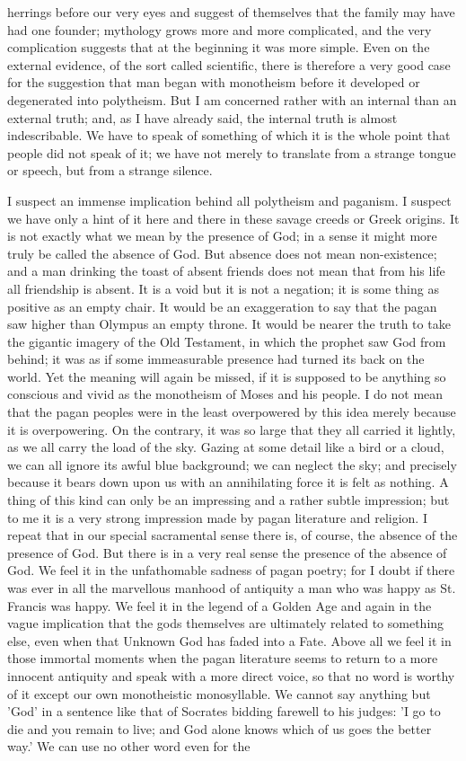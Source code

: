 herrings before our very eyes and suggest of themselves that the family may have had one founder; mythology grows more and more complicated, and the very complication suggests that at the beginning it was more simple. Even on the external evidence, of the sort called scientific, there is therefore a very good case for the suggestion that man began with monotheism before it developed or degenerated into polytheism. But I am concerned rather with an internal than an external truth; and, as I have already said, the internal truth is almost indescribable. We have to speak of something of which it is the whole point that people did not speak of it; we have not merely to translate from a strange tongue or speech, but from a strange silence.

I suspect an immense implication behind all polytheism and paganism. I suspect we have only a hint of it here and there in these savage creeds or Greek origins. It is not exactly what we mean by the presence of God; in a sense it might more truly be called the absence of God. But absence does not mean non-existence; and a man drinking the toast of absent friends does not mean that from his life all friendship is absent. It is a void but it is not a negation; it is some thing as positive as an empty chair. It would be an exaggeration to say that the pagan saw higher than Olympus an empty throne. It would be nearer the truth to take the gigantic imagery of the Old Testament, in which the prophet saw God from behind; it was as if some immeasurable presence had turned its back on the world. Yet the meaning will again be missed, if it is supposed to be anything so conscious and vivid as the monotheism of Moses and his people. I do not mean that the pagan peoples were in the least overpowered by this idea merely because it is overpowering. On the contrary, it was so large that they all carried it lightly, as we all carry the load of the sky. Gazing at some detail like a bird or a cloud, we can all ignore its awful blue background; we can neglect the sky; and precisely because it bears down upon us with an annihilating force it is felt as nothing. A thing of this kind can only be an impressing and a rather subtle impression; but to me it is a very strong impression made by pagan literature and religion. I repeat that in our special sacramental sense there is, of course, the absence of the presence of God. But there is in a very real sense the presence of the absence of God. We feel it in the unfathomable sadness of pagan poetry; for I doubt if there was ever in all the marvellous manhood of antiquity a man who was happy as St. Francis was happy. We feel it in the legend of a Golden Age and again in the vague implication that the gods themselves are ultimately related to something else, even when that Unknown God has faded into a Fate. Above all we feel it in those immortal moments when the pagan literature seems to return to a more innocent antiquity and speak with a more direct voice, so that no word is worthy of it except our own monotheistic monosyllable. We cannot say anything but 'God' in a sentence like that of Socrates bidding farewell to his judges: 'I go to die and you remain to live; and God alone knows which of us goes the better way.' We can use no other word even for the 